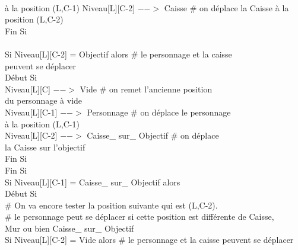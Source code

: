 \documentclass{article}
\begin{document}
\begin{tabbing}
\\ \hspace{5cm} à la position (L,C-1)
\hspace{5cm}				Niveau[L][C-2] $-->$ Caisse	\# on déplace la Caisse à la position (L,C-2)
\\	\hspace{4cm}		Fin Si
\\
\\	\hspace{4cm}		Si Niveau[L][C-2] = Objectif alors         	\# le personnage et la caisse 
\\ \hspace{4cm} peuvent se déplacer
\\	\hspace{4cm}		Début Si
\\	\hspace{5cm}			Niveau[L][C] $-->$ Vide 			\# on remet l'ancienne position 
\\ \hspace{5cm} du personnage à vide
\\	\hspace{5cm}			Niveau[L][C-1] $-->$ Personnage		\# on déplace le personnage
\\ \hspace{5cm} à la position (L,C-1)
\\	\hspace{5cm}		Niveau[L][C-2] $-->$ Caisse\_ sur\_ Objectif	\# on déplace 
\\ \hspace{5cm} la Caisse sur l'objectif
\\	\hspace{4cm}	Fin Si
\\	\hspace{3cm}   Fin Si
\\	\hspace{3cm}	Si Niveau[L][C-1] = Caisse\_ sur\_ Objectif alors			
\\	\hspace{3cm}	Début Si
\\	\hspace{4cm}		\# On va encore tester la position suivante qui est (L,C-2). 
\\	\hspace{4cm}	\# le personnage peut se déplacer si cette position est différente de Caisse, 
\\ \hspace{4cm} Mur ou bien Caisse\_ sur\_ Objectif
\\	\hspace{4cm}	Si Niveau[L][C-2] = Vide alors         			\# le personnage et la caisse peuvent se déplacer

\end{tabbing}
\end{document}
